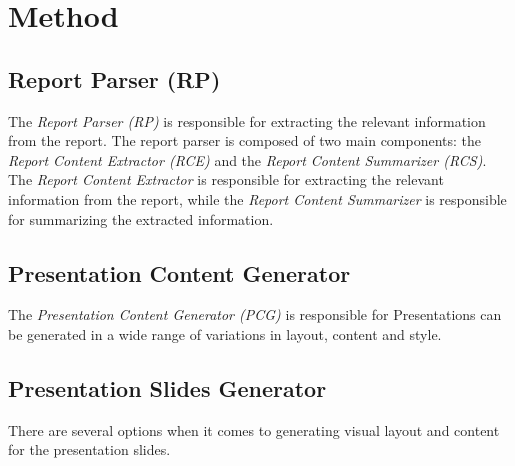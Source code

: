 \section{Method}

\subsection{Report Parser (RP)}
The \emph{Report Parser (RP)} is responsible for extracting the relevant information from the report. The report parser is composed of two main components: the \emph{Report Content Extractor (RCE)} and the \emph{Report Content Summarizer (RCS)}. The \emph{Report Content Extractor} is responsible for extracting the relevant information from the report, while the \emph{Report Content Summarizer} is responsible for summarizing the extracted information.

\subsection{Presentation Content Generator}
The \emph{Presentation Content Generator (PCG)} is responsible for 
Presentations can be generated in a wide range of variations in layout, content and style. 

\subsection{Presentation Slides Generator}
There are several options when it comes to generating visual layout and content for the presentation slides. 



